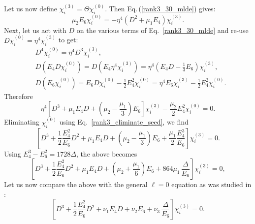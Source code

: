 \documentclass[11pt]{article}
\newcommand{\eref}[1]{Eq.\,(\ref{#1})}
\begin{document}
Let us now define $\chi_i^{(3)}=\Theta \chi_i^{(0)}$. Then \eref{rank3_30_mlde} gives:
\begin{equation}
    \mu_2 E_6\chi_i^{(0)}
    =
    -\eta^4
    \left(
        D^2
        +
        \mu_1 E_4
    \right)\chi_i^{(3)} .
    \label{rank3_eliminate_seed}
\end{equation}
Next, let us act with \(D\) on the various terms of Eq.~\eqref{rank3_30_mlde} and re-use $D\chi_i^{(0)} = \eta^4\chi_i^{(3)}$ to get:
\begin{equation}
\begin{split}
    &D^4\chi_i^{(0)}
    =
    \eta^4D^3\chi_i^{(3)},\\
    &D(E_4D\chi_i^{(0)})
    =
    D(E_4\eta^4\chi_i^{(3)})
     =
    \eta^4
    \left(
        E_4D-\frac13E_6
    \right)\chi_i^{(3)},\\
    &D(E_6\chi_i^{(0)})
    =
    E_6D\chi_i^{(0)}
    -
    \frac12E_4^2\chi_i^{(0)}
     =
    \eta^4E_6\chi_i^{(3)}
    -
    \frac12E_4^2\chi_i^{(0)} .
\end{split}    
\end{equation}
Therefore
\begin{equation}
    \eta^4
    \left[
        D^3
        +
        \mu_1 E_4D
        +
        \left(\mu_2-\frac{\mu_1}{3}\right)E_6
    \right]\chi_i^{(3)}
    -
    \frac{\mu_2}{2}E_4^2\chi_i^{(0)}
    =
    0 .
\end{equation}
Eliminating \(\chi_i^{(0)}\) using Eq.~\eqref{rank3_eliminate_seed}, we find
\begin{equation}
    \left[
        D^3
        +
        \frac12\frac{E_4^2}{E_6}D^2
        +
        \mu_1 E_4D
        +
        \left(\mu_2-\frac{\mu_1}{3}\right)E_6
        +
        \frac{\mu_1}{2}\frac{E_4^3}{E_6}
    \right]\chi_i^{(3)}
    =
    0 .
\end{equation}
Using \(E_4^3-E_6^2=1728\Delta\), the above becomes
\begin{equation}
    \left[
        D^3
        +
        \frac12\frac{E_4^2}{E_6}D^2
        +
        \mu_1 E_4D
        +
        \left(\mu_2+\frac{\mu_1}{6}\right)E_6
        +
        864\mu_1\,\frac{\Delta}{E_6}
    \right]\chi_i^{(3)}
    =
    0,
    \label{rank3_33_image}
\end{equation}
Let us now compare the above with the general \(\ell=0\) equation as was studied in \cite{Gowdigere:2023xnm}:
\begin{equation}
    \left[
        D^3
        +
        \frac12\frac{E_4^2}{E_6}D^2
        +
        \nu_1 E_4D
        +
        {\nu}_2 E_6
        +
        {\nu}_3\,\frac{\Delta}{E_6}
    \right]\chi_i^{(3)}
    =
    0 .
    \label{rank3_33_raw}
\end{equation}
\end{document}
